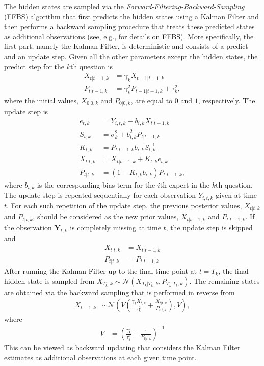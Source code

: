\documentclass[aoas, preprint]{imsart}
\numberwithin{equation}{section}
\theoremstyle{plain}
\begin{document}
\begin{center}
\end{center}
The hidden states are sampled via the \textit{Forward-Filtering-Backward-Sampling} (FFBS) algorithm that first predicts the hidden states using a Kalman Filter and then performs a backward sampling procedure that treats these predicted states as additional observations (see, e.g., \cite{carter1994gibbs, migon2005dynamic} for details on FFBS). More specifically, the first part, namely the Kalman Filter, is deterministic and consists of a predict and an update step. Given all the other parameters except the hidden states, the predict step for the $k$th question is
\begin{align*}
X_{t|t-1,k} &= \gamma_k X_{t-1|t-1,k} \\
P_{t|t-1, k} &= \gamma_k^2 P_{t-1|t-1, k} + \tau_k^2,
\end{align*}
where the initial values, $X_{0|0,k}$ and $P_{0|0, k}$, are equal to $0$ and $1$, respectively. The update step is 
\begin{align*}
e_{t,k} &= Y_{i,t,k} - b_{i,k} X_{t | t-1, k} \\
S_{t,k} &=  \sigma_k^2 + b_{i,k}^2 P_{t|t-1, k}\\
K_{t,k} &=  P_{t|t-1, k} b_{i,k} S_{t,k}^{-1} \\
X_{t|t, k} &= X_{t|t-1, k} + K_{t,k} e_{t,k} \\
P_{t|t,k} &= (1 - K_{t,k} b_{i,k}) P_{t|t-1,k},
\end{align*}
where $b_{i,k}$ is the corresponding bias term for the $i$th expert in the $k$th question. The update step is repeated sequentially for each observation $Y_{i,t,k}$ given at time $t$. For each such repetition of the update step, the previous posterior values, $X_{t|t, k}$ and $P_{t|t, k}$, should be considered as the new prior values, $X_{t|t-1, k}$ and $P_{t|t-1, k}$. If the observation $\boldsymbol{Y}_{t,k}$ is completely missing at time $t$, the update step is skipped and 
\begin{align*}
X_{t|t, k} &= X_{t|t-1, k}\\
P_{t|t,k} &= P_{t|t-1,k}
\end{align*}
After running the Kalman Filter up to the final time point at $t = T_k$, the final hidden state is sampled from $X_{T_k,k} \sim \mathcal{N}(X_{T_k|T_k, k}, P_{T_k|T_k, k})$. The remaining states are obtained via the backward sampling that is performed in reverse from
\begin{align*}
X_{t-1, k} &\sim  \mathcal{N} \left(V\left( \frac{\gamma_kX_{t,k}}{\tau_k^2}  + \frac{X_{t|t,k}}{P_{t|t,k} } \right),  V\right),
\end{align*}
where
\begin{align*}
V &= \left( \frac{\gamma_k^2}{\tau_k^2} + \frac{1}{P_{t|t,k}}\right)^{-1}
\end{align*}
This can be viewed as backward updating that considers the Kalman Filter estimates as additional observations at each given time point. 
\end{document}
